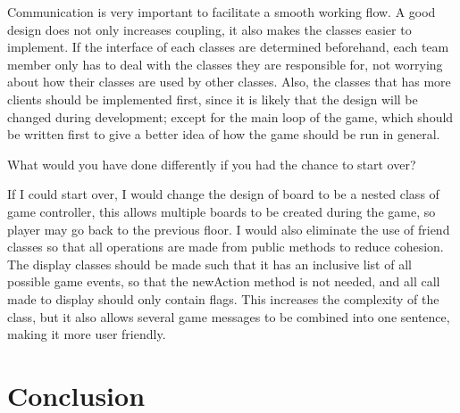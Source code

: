 \documentclass[11pt]{article}
\theoremstyle{plain} \newtheorem{theorem*}{Theorem}[subsection]
\begin{document}
Communication is very important to facilitate a smooth working flow. A good
design does not only increases coupling, it also makes the classes easier to
implement. If the interface of each classes are determined beforehand, each
team member only has to deal with the classes they are responsible for, not
worrying about how their classes are used by other classes. Also, the classes
that has more clients should be implemented first, since it is likely that the
design will be changed during development; except for the main loop of the
game, which should be written first to give a better idea of how the game
should be run in general.  

What would you have done differently if you had the chance to start over? 

If I could start over, I would change the design of board to be a nested class
of game controller, this allows multiple boards to be created during the game,
so player may go back to the previous floor. I would also eliminate the use of
friend classes so that all operations are made from public methods to reduce
cohesion. The display classes should be made such that it has an inclusive list
of all possible game events, so that the newAction method is not needed, and
all call made to display should only contain flags. This increases the
complexity of the class, but it also allows several game messages to be
combined into one sentence, making it more user friendly.  




\section{Conclusion}
\end{document}
